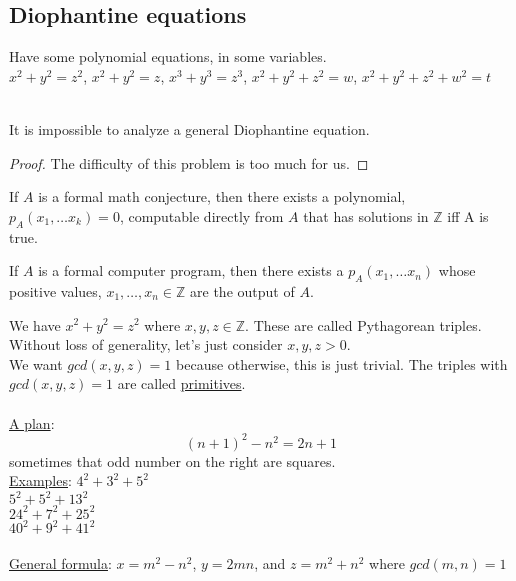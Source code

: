   \subsection*{Diophantine equations}
    Have some polynomial equations, in some variables.\\
    $x^2 + y^2 = z^2$, $x^2 + y^2 = z$, $x^3 + y^3 = z^3$, $x^2 + y^2 + z^2 = 
    w$, $x^2 + y^2 + z^2 + w^2 = t$\\\\
    \begin{theorem}
      It is impossible to analyze a general Diophantine equation.
    \end{theorem}
    \begin{proof}
      The difficulty of this problem is too much for us.
    \end{proof}
    \begin{theorem}
      If $A$ is a formal math conjecture, then there exists a polynomial,
      $p_A(x_1, \ldots x_k) = 0$, computable directly from $A$ that has 
      solutions in $\mathbb{Z}$ iff A is true.
    \end{theorem}
    \begin{theorem}
      If $A$ is a formal computer program, then there exists a $p_A(x_1, \ldots
      x_n)$ whose positive values, $x_1, \ldots, x_n \in \mathbb{Z}$ are
      the output of $A$.
    \end{theorem}
    We have $x^2 + y^2 = z^2$ where $x, y, z \in \mathbb{Z}$. These are called
    Pythagorean triples.\\
    Without loss of generality, let's just consider $x,y,z > 0$.\\
    We want $gcd(x,y,z) = 1$ because otherwise, this is just trivial. The
    triples with $gcd(x,y,z) = 1$ are called \underline{primitives}.\\\\
    \underline{A plan}: 
    $$
      (n+1)^2 - n^2 = 2n + 1
    $$
    sometimes that odd number on the right are squares.\\
    \underline{Examples}:
    $4^2 + 3^2 + 5^2$\\
    $5^2 + 5^2 + 13^2$\\
    $24^2 + 7^2 + 25^2$\\
    $40^2 + 9^2 + 41^2$\\\\
    \underline{General formula}:
      $x = m^2 - n^2$, $y = 2mn$, and $z = m^2 + n^2$ where $gcd(m,n) = 1$
